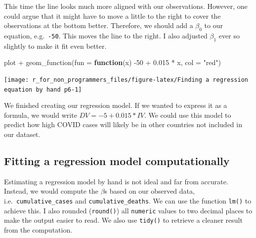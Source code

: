 \documentclass[
]{book}
\newenvironment{Shaded}{\begin{snugshade}}{\end{snugshade}}
\newcommand{\AttributeTok}[1]{\textcolor[rgb]{0.77,0.63,0.00}{#1}}
\newcommand{\ControlFlowTok}[1]{\textcolor[rgb]{0.13,0.29,0.53}{\textbf{#1}}}
\newcommand{\DecValTok}[1]{\textcolor[rgb]{0.00,0.00,0.81}{#1}}
\newcommand{\FloatTok}[1]{\textcolor[rgb]{0.00,0.00,0.81}{#1}}
\newcommand{\FunctionTok}[1]{\textcolor[rgb]{0.00,0.00,0.00}{#1}}
\newcommand{\NormalTok}[1]{#1}
\newcommand{\SpecialCharTok}[1]{\textcolor[rgb]{0.00,0.00,0.00}{#1}}
\newcommand{\StringTok}[1]{\textcolor[rgb]{0.31,0.60,0.02}{#1}}
\begin{document}
This time the line looks much more aligned with our observations. However, one could argue that it might have to move a little to the right to cover the observations at the bottom better. Therefore, we should add a \(\beta_0\) to our equation, e.g.~\texttt{-50}. This moves the line to the right. I also adjusted \(\beta_1\) ever so slightly to make it fit even better.

\begin{Shaded}
\begin{Highlighting}[]
\NormalTok{plot }\SpecialCharTok{+}
  \FunctionTok{geom\_function}\NormalTok{(}\AttributeTok{fun =} \ControlFlowTok{function}\NormalTok{(x) }\SpecialCharTok{{-}}\DecValTok{50} \SpecialCharTok{+} \FloatTok{0.015} \SpecialCharTok{*}\NormalTok{ x, }\AttributeTok{col =} \StringTok{"red"}\NormalTok{)}
\end{Highlighting}
\end{Shaded}

\begin{center}\texttt{[image: r\_for\_non\_programmers\_files/figure-latex/Finding a regression equation by hand p6-1]} \end{center}

We finished creating our regression model. If we wanted to express it as a formula, we would write \(DV = -5 + 0.015 * IV\). We could use this model to predict how high COVID cases will likely be in other countries not included in our dataset.

\hypertarget{fitting-a-regression-model-computationally}{%
\subsection{Fitting a regression model computationally}\label{fitting-a-regression-model-computationally}}

Estimating a regression model by hand is not ideal and far from accurate. Instead, we would compute the \(\beta\)s based on our observed data, i.e.~\texttt{cumulative\_cases} and \texttt{cumulative\_deaths}. We can use the function \texttt{lm()} to achieve this. I also rounded (\texttt{round()}) all \texttt{numeric} values to two decimal places to make the output easier to read. We also use \texttt{tidy()} to retrieve a cleaner result from the computation.
\end{document}
